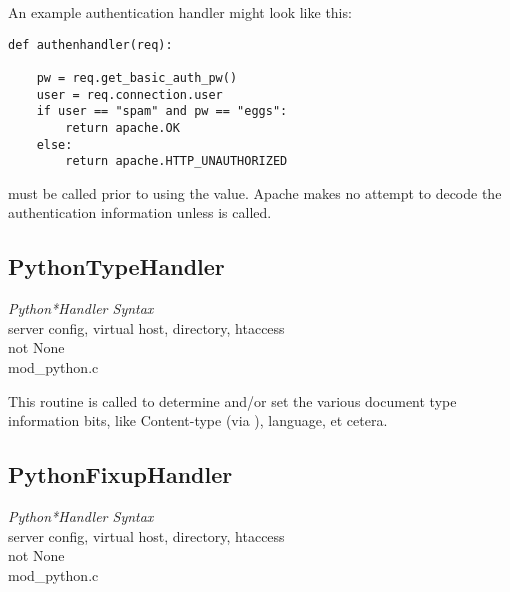 An example authentication handler might look like this: 

\begin{verbatim}
def authenhandler(req):

    pw = req.get_basic_auth_pw()
    user = req.connection.user     
    if user == "spam" and pw == "eggs":
        return apache.OK
    else:
        return apache.HTTP_UNAUTHORIZED
\end{verbatim}    

  must be called prior to using the
 value. Apache makes no attempt to decode the
authentication information unless  is called.

\subsection{PythonTypeHandler\label{dir-handlers-tph}}

\emph{Python*Handler Syntax}\\
server config, virtual host, directory, htaccess\\
not None\\
mod_python.c

This routine is called to determine and/or set the various document
type information bits, like Content-type (via ),
language, et cetera.

\subsection{PythonFixupHandler\label{dir-handlers-fuh}}

\emph{Python*Handler Syntax}\\
server config, virtual host, directory, htaccess\\
not None\\
mod_python.c

